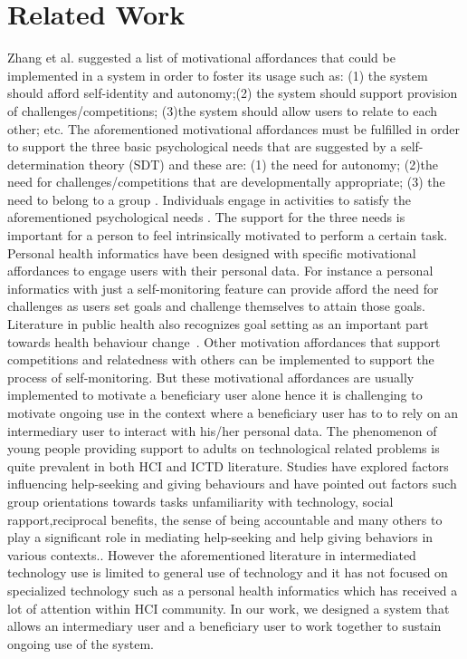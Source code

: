 \documentclass{sig-alternate}
\begin{document}
\section{Related Work} 
Zhang et al.\cite{zhang2008:motivational} suggested a list of motivational affordances that could be implemented in a system in order to foster its usage such as: (1) the system should afford self-identity and autonomy;(2) the system should support provision of challenges/competitions; (3)the system should allow users to relate to each other; etc. The aforementioned motivational affordances must be fulfilled in order to support the three basic psychological needs that are suggested by a self-determination theory (SDT) and these are: (1) the need for autonomy; (2)the need for challenges/competitions that are developmentally appropriate;  (3) the need to belong to a group \cite{deci1985:intrinsic}. Individuals engage in activities to satisfy the aforementioned psychological needs \cite{deterding2011:situated}. The support for the three needs is important for a person to feel intrinsically motivated to perform a certain task.\newline     
Personal health informatics have been designed with specific motivational affordances to engage users with their personal data. For instance a personal informatics with just a self-monitoring feature can provide afford the need for challenges as users set goals and challenge themselves to attain those goals. Literature in public health also recognizes goal setting as an important part towards health behaviour change~\cite{strecher1995goal}. Other motivation affordances that support competitions and relatedness with others can be implemented to support the process of self-monitoring. But these motivational affordances are usually implemented to motivate a beneficiary user alone hence it is challenging to motivate ongoing use in the context where a beneficiary user has to to rely on an intermediary user to interact with his/her personal data.
The phenomenon of young people providing support to adults on technological related problems is quite prevalent in both HCI and ICTD literature. Studies have explored factors influencing help-seeking and giving behaviours and have pointed out factors such group orientations towards tasks unfamiliarity with technology, social rapport,reciprocal benefits, the sense of being accountable and many others to play a significant role in mediating help-seeking and help giving behaviors in various contexts.\cite{sambasivan2010,poole:chh,kiesler:twi,parikh2006}. However the aforementioned literature in intermediated technology use is limited to general use of technology and it has not focused on specialized technology such as a personal health informatics which has received a lot of attention within HCI community. In our work, we designed a system that allows an intermediary user and a beneficiary user to work together to sustain ongoing use of the system.\newline
\end{document}
